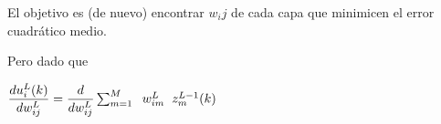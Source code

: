 El objetivo es (de nuevo) encontrar $w_ij$ de cada capa que minimicen el error cuadrático medio.


Pero dado que

$
\dfrac{du_i^L (k)}{dw_{ij}^L} = \dfrac{d}{dw_{ij}^L}  \sum_{m=1}^{M} \hspace{0.2cm} w_{im}^L \hspace{0.2cm} z_{m}^{L-1} (k) 
$

